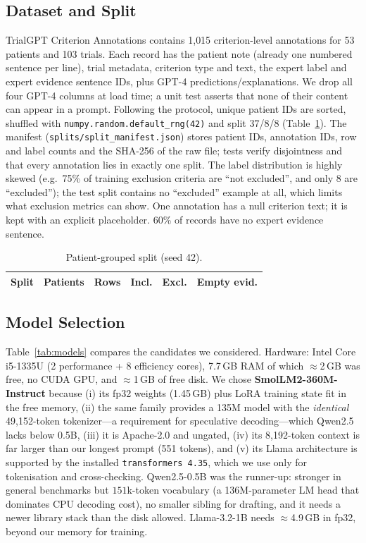 \documentclass[conference]{IEEEtran}
\begin{document}
\subsection{Dataset and Split}
TrialGPT Criterion Annotations contains 1{,}015 criterion-level annotations for 53 patients and 103 trials. Each record has the patient note (already one numbered sentence per line), trial metadata, criterion type and text, the expert label and expert evidence sentence IDs, plus GPT-4 predictions/explanations. We drop all four GPT-4 columns at load time; a unit test asserts that none of their content can appear in a prompt. Following the protocol, unique patient IDs are sorted, shuffled with \texttt{numpy.random.default\_rng(42)} and split 37/8/8 (Table~\ref{tab:split}). The manifest (\texttt{splits/split\_manifest.json}) stores patient IDs, annotation IDs, row and label counts and the SHA-256 of the raw file; tests verify disjointness and that every annotation lies in exactly one split. The label distribution is highly skewed (e.g.\ 75\% of training exclusion criteria are ``not excluded'', and only 8 are ``excluded''); the test split contains no ``excluded'' example at all, which limits what exclusion metrics can show. One annotation has a null criterion text; it is kept with an explicit placeholder. 60\% of records have no expert evidence sentence.

\begin{table}[t]\centering\caption{Patient-grouped split (seed 42).}\label{tab:split}
\begin{tabular}{lrrrrr}\toprule
Split & Patients & Rows & Incl. & Excl. & Empty evid.\\\midrule

\bottomrule\end{tabular}\end{table}

\subsection{Model Selection}
Table~\ref{tab:models} compares the candidates we considered. Hardware: Intel Core i5-1335U (2 performance + 8 efficiency cores), 7.7\,GB RAM of which $\approx$2\,GB was free, no CUDA GPU, and $\approx$1\,GB of free disk. We chose \textbf{SmolLM2-360M-Instruct} because (i) its fp32 weights (1.45\,GB) plus LoRA training state fit in the free memory, (ii) the same family provides a 135M model with the \emph{identical} 49{,}152-token tokenizer---a requirement for speculative decoding---which Qwen2.5 lacks below 0.5B, (iii) it is Apache-2.0 and ungated, (iv) its 8{,}192-token context is far larger than our longest prompt (551 tokens), and (v) its Llama architecture is supported by the installed \texttt{transformers 4.35}, which we use only for tokenisation and cross-checking. Qwen2.5-0.5B was the runner-up: stronger in general benchmarks but $151$k-token vocabulary (a 136M-parameter LM head that dominates CPU decoding cost), no smaller sibling for drafting, and it needs a newer library stack than the disk allowed. Llama-3.2-1B needs $\approx$4.9\,GB in fp32, beyond our memory for training.
\end{document}
